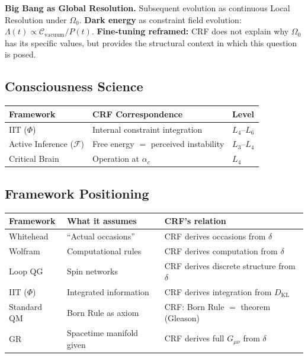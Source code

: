 \documentclass[12pt, a4paper]{article}
\begin{document}
\textbf{Big Bang as Global Resolution.} Subsequent evolution as continuous Local Resolution
under $\Omega_0$. \textbf{Dark energy} as constraint field evolution: $\Lambda(t) \propto
\mathcal{C}_{\mathrm{vacuum}}/P(t)$. \textbf{Fine-tuning reframed:} CRF does not explain
why $\Omega_0$ has its specific values, but provides the structural context in which this
question is posed.

\subsection{Consciousness Science}

\begin{center}
\renewcommand{\arraystretch}{1.2}
\begin{tabular}{p{3.2cm} p{5.5cm} p{2.5cm}}
\toprule
\textbf{Framework} & \textbf{CRF Correspondence} & \textbf{Level} \\
\midrule
IIT ($\Phi$) & Internal constraint integration & $L_4$--$L_6$ \\
Active Inference ($\mathcal{F}$) & Free energy $=$ perceived instability & $L_3$--$L_4$ \\
Critical Brain & Operation at $\alpha_c$ & $L_4$ \\
\bottomrule
\end{tabular}
\end{center}

\subsection{Framework Positioning}

\begin{center}
\renewcommand{\arraystretch}{1.2}
\begin{tabular}{p{2.8cm} p{4.5cm} p{5.0cm}}
\toprule
\textbf{Framework} & \textbf{What it assumes} & \textbf{CRF's relation} \\
\midrule
Whitehead & ``Actual occasions'' & CRF derives occasions from $\delta$ \\
Wolfram & Computational rules & CRF derives computation from $\delta$ \\
Loop QG & Spin networks & CRF derives discrete structure from $\delta$ \\
IIT ($\Phi$) & Integrated information & CRF derives integration from $D_{\mathrm{KL}}$ \\
Standard QM & Born Rule as axiom & CRF: Born Rule $=$ theorem (Gleason) \\
GR & Spacetime manifold given & CRF derives full $G_{\mu\nu}$ from $\delta$ \\
\bottomrule
\end{tabular}
\end{center}
\end{document}
